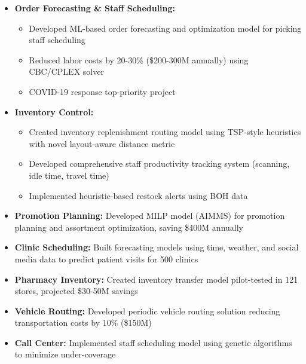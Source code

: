 \documentclass[12pt,a4paper,sans]{moderncv}
\begin{document}
{
    \begin{itemize}
        \item \textbf{Order Forecasting \& Staff Scheduling:}
        \begin{itemize}
            \item Developed ML-based order forecasting and optimization model for picking staff scheduling
            \item Reduced labor costs by 20-30\% (\$200-300M annually) using CBC/CPLEX solver
            \item COVID-19 response top-priority project
        \end{itemize}
        \item \textbf{Inventory Control:}
        \begin{itemize}
            \item Created inventory replenishment routing model using TSP-style heuristics with novel layout-aware distance metric
            \item Developed comprehensive staff productivity tracking system (scanning, idle time, travel time)
            \item Implemented heuristic-based restock alerts using BOH data
        \end{itemize}
    \end{itemize}
}

{
    \begin{itemize}
        \item \textbf{Promotion Planning:} Developed MILP model (AIMMS) for promotion planning and assortment optimization, saving \$400M annually
        \item \textbf{Clinic Scheduling:} Built forecasting models using time, weather, and social media data to predict patient visits for 500 clinics
        \item \textbf{Pharmacy Inventory:} Created inventory transfer model pilot-tested in 121 stores, projected \$30-50M savings
        \item \textbf{Vehicle Routing:} Developed periodic vehicle routing solution reducing transportation costs by 10\% (\$150M)
        \item \textbf{Call Center:} Implemented staff scheduling model using genetic algorithms to minimize under-coverage
    \end{itemize}
}
\end{document}
